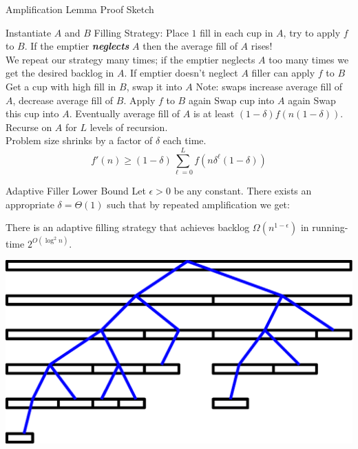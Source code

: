 \documentclass[xcolor=x11names, svgnames, rgb]{beamer}
\newcommand{\defn}[1]       {{\textit{\textbf{\boldmath #1}}}}
\begin{document}
\begin{frame}[t]{Amplification Lemma Proof Sketch}
\begin{overprint}
  \end{overprint}
  \begin{overprint}
     Instantiate $A$ and $B$
     Filling Strategy: Place $1$ fill in each cup in $A$, try to apply $f$ to $B$. 
     If the emptier \defn{neglects} $A$
    then the average fill of $A$ rises! \\We
    repeat our strategy many times; if the emptier
    neglects $A$ too many times we get the desired
    backlog in $A$.
     If emptier doesn't neglect $A$ filler can apply $f$ to $B$
     Get a cup with high fill in $B$, swap it into $A$
     Note: swaps increase average fill of $A$, decrease average fill of $B$.
     Apply $f$ to $B$ again
     Swap cup into $A$ again
     Swap this cup into $A$.
     Eventually average fill of $A$ is at least $(1-\delta)f(n(1-\delta)).$
     Recurse on $A$ for $L$ levels of recursion. \\Problem size shrinks by a factor of $\delta$ each time. 
     $$f'(n) \ge (1-\delta)\sum_{\ell=0}^L f(n\delta^\ell(1-\delta))$$
  \end{overprint}
\end{frame}

\begin{frame}[t]{Adaptive Filler Lower Bound}
  Let $\epsilon > 0$ be any constant. There exists an appropriate $\delta=\Theta(1)$ such that by repeated amplification we get: 
  \begin{theorem}
    There is an adaptive filling strategy that achieves
    backlog $\Omega(n^{1-\epsilon})$  in running-time $2^{O(\log^2 n)}$.
  \end{theorem}
  \vspace{0.5cm}
  \includegraphics[width=0.7\linewidth]{amplificationImgs/quasipoly_cor.eps}
\end{frame}
\end{document}
